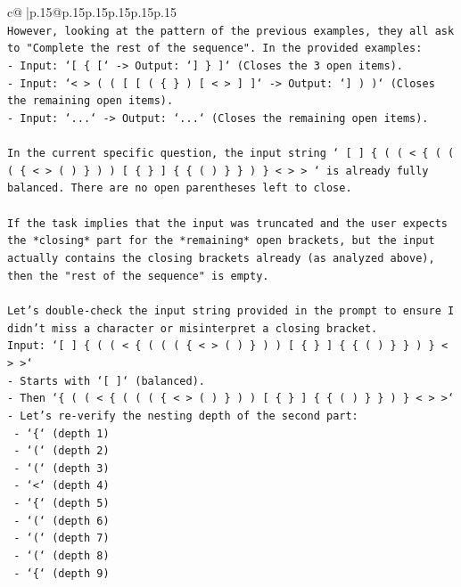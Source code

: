 \documentclass{article}
\begin{document}
{\begin{supertabular}{c@{$\;$}|p{.15\linewidth}@{}p{.15\linewidth}p{.15\linewidth}p{.15\linewidth}p{.15\linewidth}p{.15\linewidth}}
{{{\\ 
\texttt{However, looking at the pattern of the previous examples, they all ask to "Complete the rest of the sequence". In the provided examples:} \\
\texttt{{-} Input: `{[} \{ {[}` {-}> Output: `{]} \} {]}` (Closes the 3 open items).} \\
\texttt{{-} Input: `< > ( ( {[} {[} ( \{ \} ) {[} < > {]} {]}` {-}> Output: `{]} ) )` (Closes the remaining open items).} \\
\texttt{{-} Input: `...` {-}> Output: `...` (Closes the remaining open items).} \\
\\ 
\texttt{In the current specific question, the input string ` {[} {]} \{ ( ( < \{ ( ( ( \{ < > ( ) \} ) ) {[} \{ \} {]} \{ \{ ( ) \} \} ) \} < > > ` is already fully balanced. There are no open parentheses left to close.} \\
\\ 
\texttt{If the task implies that the input was truncated and the user expects the *closing* part for the *remaining* open brackets, but the input actually contains the closing brackets already (as analyzed above), then the "rest of the sequence" is empty.} \\
\\ 
\texttt{Let's double{-}check the input string provided in the prompt to ensure I didn't miss a character or misinterpret a closing bracket.} \\
\texttt{Input: `{[} {]} \{ ( ( < \{ ( ( ( \{ < > ( ) \} ) ) {[} \{ \} {]} \{ \{ ( ) \} \} ) \} < > >`} \\
\texttt{{-} Starts with `{[} {]}` (balanced).} \\
\texttt{{-} Then `\{ ( ( < \{ ( ( ( \{ < > ( ) \} ) ) {[} \{ \} {]} \{ \{ ( ) \} \} ) \} < > >`} \\
\texttt{{-} Let's re{-}verify the nesting depth of the second part:} \\
\texttt{  {-} `\{` (depth 1)} \\
\texttt{  {-} `(` (depth 2)} \\
\texttt{  {-} `(` (depth 3)} \\
\texttt{  {-} `<` (depth 4)} \\
\texttt{  {-} `\{` (depth 5)} \\
\texttt{  {-} `(` (depth 6)} \\
\texttt{  {-} `(` (depth 7)} \\
\texttt{  {-} `(` (depth 8)} \\
\texttt{  {-} `\{` (depth 9)} \\
}}}
\end{supertabular}}
\end{document}
